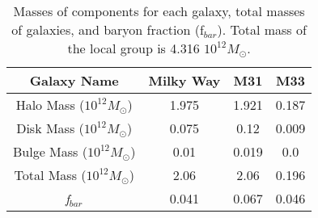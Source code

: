 \documentclass{article}
\begin{document}
\begin{table}
    \centering
    \begin{tabular}{|c|c|c|c|}
    \hline
         Galaxy Name & Milky Way & M31 & M33 \\ \hline
         Halo Mass ($10^{12} M_{\odot}$) & 1.975 & 1.921 & 0.187 \\ \hline
         Disk Mass ($10^{12} M_{\odot}$) & 0.075 & 0.12 & 0.009 \\ \hline
         Bulge Mass ($10^{12} M_{\odot}$) & 0.01 & 0.019 & 0.0 \\ \hline
         Total Mass ($10^{12} M_{\odot}$) & 2.06 & 2.06 & 0.196 \\ \hline
         \textit{f}$_{bar}$& 0.041 & 0.067 & 0.046 \\ \hline
    \end{tabular}
    \caption{Masses of components for each galaxy, total masses of galaxies, and baryon fraction (f$_{bar}$). Total mass of the local group is 4.316 $10^{12} M_{\odot}$.}
    \label{tab:my_label}
\end{table}
\end{document}
